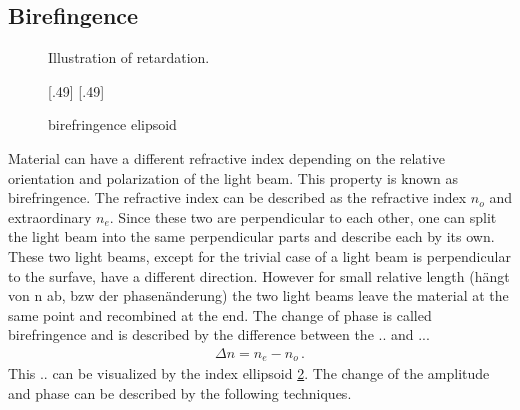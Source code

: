 \subsection{Birefingence}
%
\begin{figure}[!t]
\centering
\def\tikzwidth{\textwidth}
\caption{Illustration of retardation.}
\label{fig:optic_retardation}
\end{figure}
% 
\begin{figure}[!t]
\centering
\subcaptionbox{}[.49\textwidth]{
\def\tikzwidth{0.49*\textwidth}
}
\subcaptionbox{}[.49\textwidth]{
\def\tikzwidth{0.49*\textwidth}
}
\caption{birefringence elipsoid}
\label{fig:index_elipsoid}
\end{figure}
% 
Material can have a different refractive index depending on the relative orientation and polarization of the light beam.
This property is known as birefringence.
The refractive index can be described as the refractive index $n_o$ and extraordinary  $n_e$.
Since these two are perpendicular to each other, one can split the light beam into the same perpendicular parts and describe each by its own.
These two light beams, except for the trivial case of a light beam is perpendicular to the surfave, have a different direction.
However for small relative length (hängt von n ab, bzw der phasenänderung) the two light beams leave the material at the same point and recombined at the end.
The change of phase is called birefringence and is described by the difference between the .. and ...
% 
\begin{align}
    \Delta n = n_e - n_o \, .
\end{align}
% 
This .. can be visualized by the index ellipsoid \cref{fig:index_elipsoid}.
The change of the amplitude and phase can be described by the following techniques.
% 
% 
% 
